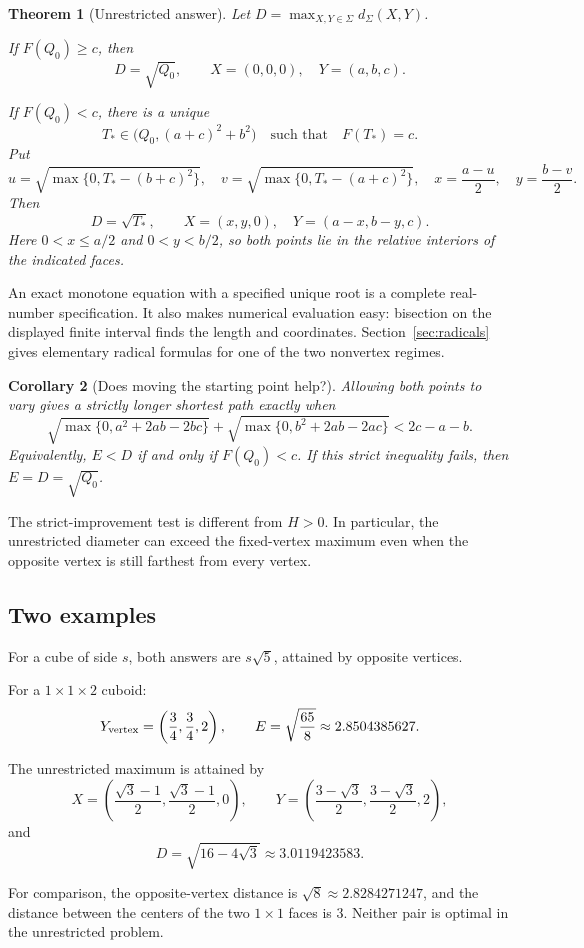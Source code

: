 \documentclass[11pt]{article}
\newtheorem{theorem}{Theorem}[section]
\newtheorem{corollary}[theorem]{Corollary}
\theoremstyle{definition}
\newcommand{\surf}{\Sigma}
\newcommand{\spq}[1]{\sqrt{\max\{0,#1\}}}
\newcommand{\dist}{d_{\surf}}
\newcommand{\sqzero}{Q_0}
\newcommand{\vertexecc}{E}
\newcommand{\diameter}{D}
\begin{document}
\begin{theorem}[Unrestricted answer]\label{thm:diam}
Let \(\diameter=\max_{X,Y\in\surf}\dist(X,Y)\).

If \(F(\sqzero)\ge c\), then
\[
\boxed{\ \diameter=\sqrt{\sqzero},\qquad X=(0,0,0),\quad
Y=(a,b,c).\ }
\]

If \(F(\sqzero)<c\), there is a unique
\[
T_*\in\bigl(\sqzero,(a+c)^2+b^2\bigr)
\quad\text{such that}\quad F(T_*)=c.
\]
Put
\begin{equation}\label{eq:witness}
u=\spq{T_*-(b+c)^2},\quad v=\spq{T_*-(a+c)^2},
\quad x=\frac{a-u}{2},\quad y=\frac{b-v}{2}.
\end{equation}
Then
\[
\boxed{\ \diameter=\sqrt{T_*},\qquad
X=(x,y,0),\quad Y=(a-x,b-y,c).\ }
\]
Here \(0<x\le a/2\) and \(0<y<b/2\), so both points lie in the
relative interiors of the indicated faces.
\end{theorem}

An exact monotone equation with a specified unique root is a complete
real-number specification. It also makes numerical evaluation easy:
bisection on the displayed finite interval finds the length and
coordinates. Section~\ref{sec:radicals} gives elementary radical formulas
for one of the two nonvertex regimes.

\begin{corollary}[Does moving the starting point help?]\label{cor:strict}
Allowing both points to vary gives a strictly longer shortest path
exactly when
\begin{equation}\label{eq:strict-criterion}
\boxed{\quad
\sqrt{\max\{0,a^2+2ab-2bc\}}+
\sqrt{\max\{0,b^2+2ab-2ac\}}<2c-a-b.\quad}
\end{equation}
Equivalently, \(\vertexecc<\diameter\) if and only if
\(F(\sqzero)<c\). If this strict inequality fails, then
\(\vertexecc=\diameter=\sqrt{\sqzero}\).
\end{corollary}

The strict-improvement test is different from \(H>0\). In particular,
the unrestricted diameter can exceed the fixed-vertex maximum even
when the opposite vertex is still farthest from every vertex.

\subsection{Two examples}

For a cube of side \(s\), both answers are \(s\sqrt5\), attained by
opposite vertices.

For a \(1\times1\times2\) cuboid:
\[
Y_{\rm vertex}=\left(\frac34,\frac34,2\right),\qquad
\vertexecc=\sqrt{\frac{65}{8}}\approx2.8504385627.
\]
\begin{samepage}
The unrestricted maximum is attained by
\[
X=\left(\frac{\sqrt3-1}{2},\frac{\sqrt3-1}{2},0\right),\qquad
Y=\left(\frac{3-\sqrt3}{2},\frac{3-\sqrt3}{2},2\right),
\]
and
\[
\diameter=\sqrt{16-4\sqrt3}\approx3.0119423583.
\]
\end{samepage}
For comparison, the opposite-vertex distance is
\(\sqrt8\approx2.8284271247\), and the distance between the centers of
the two \(1\times1\) faces is \(3\). Neither pair is optimal in the
unrestricted problem.
\end{document}
